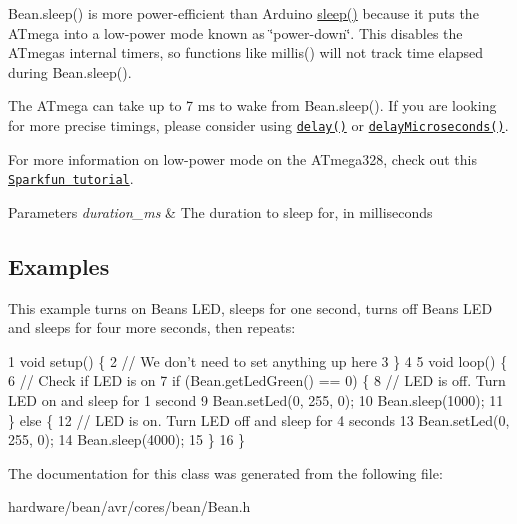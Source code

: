 {\ttfamily Bean.\+sleep()} is more power-\/efficient than Arduino {\ttfamily \hyperlink{class_bean_class_a15d6716d0bdc66a0345acc29d0c14a14}{sleep()}} because it puts the A\+Tmega into a low-\/power mode known as \char`\"{}power-\/down\char`\"{}. This disables the A\+Tmega\textquotesingle{}s internal timers, so functions like {\ttfamily millis()} will not track time elapsed during {\ttfamily Bean.\+sleep()}.

The A\+Tmega can take up to 7 ms to wake from {\ttfamily Bean.\+sleep()}. If you are looking for more precise timings, please consider using \href{https://www.arduino.cc/en/Reference/Delay}{\tt delay()} or \href{https://www.arduino.cc/en/Reference/DelayMicroseconds}{\tt delay\+Microseconds()}.

For more information on low-\/power mode on the A\+Tmega328, check out this \href{https://www.sparkfun.com/tutorials/309}{\tt Sparkfun tutorial}.


\begin{DoxyParams}{Parameters}
{\em duration\+\_\+ms} & The duration to sleep for, in milliseconds\\
\hline
\end{DoxyParams}
\subsection*{Examples}

This example turns on Bean\textquotesingle{}s L\+E\+D, sleeps for one second, turns off Bean\textquotesingle{}s L\+E\+D and sleeps for four more seconds, then repeats\+:


\begin{DoxyCodeInclude}
1 void setup() \{
2   // We don't need to set anything up here
3 \}
4 
5 void loop() \{
6   // Check if LED is on
7   if (Bean.getLedGreen() == 0) \{
8     // LED is off. Turn LED on and sleep for 1 second
9     Bean.setLed(0, 255, 0);
10     Bean.sleep(1000);
11   \} else \{
12     // LED is on. Turn LED off and sleep for 4 seconds
13     Bean.setLed(0, 255, 0);
14     Bean.sleep(4000);
15   \}
16 \}
\end{DoxyCodeInclude}
 

The documentation for this class was generated from the following file\+:\begin{DoxyCompactItemize}
\item 
hardware/bean/avr/cores/bean/Bean.\+h\end{DoxyCompactItemize}
